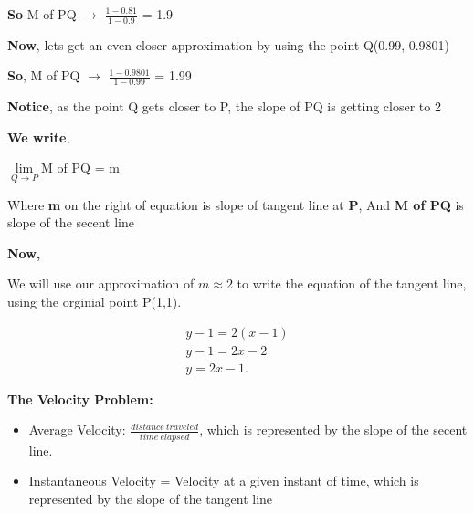 \documentclass{report}
\begin{document}
    \bigbreak \noindent 
    \begin{large}
        \textbf{So} M of PQ $\rightarrow$ $\frac{1-0.81}{1-0.9}$ = 1.9
    \end{large}

    \bigbreak \noindent 
    \textbf{Now}, lets get an even closer approximation by using the point Q(0.99, 0.9801)
    
    \bigbreak \noindent 
    \begin{large}
       \textbf{So}, M of  PQ $\rightarrow$ $ \frac{1-0.9801}{1-0.99}$ = 1.99
    \end{large}

    \pagebreak
    \noindent \textbf{Notice}, as the point Q gets closer to P, the slope of PQ is getting closer to 2
    
    \bigbreak \noindent 
    \textbf{We write}, 
    \begin{center}
        \begin{large}
            $\lim\limits_{Q \to P}${M of PQ} = m
        \end{large}
    \end{center}

    \bigbreak \noindent 
    Where \textbf{m} on the right of equation is slope of tangent line at \textbf{P}, 
    And \textbf{M of PQ} is slope of the secent line

    \bigbreak \noindent \bigbreak \noindent 
    \begin{large}
        \textbf{Now,}     
    \end{large}
    \bigbreak \noindent 
    We will use our approximation of $m \approx 2$ to write the equation of the tangent line,
    using the orginial point P(1,1).

    \begin{align*}
        y-1=2\left(x-1\right) \\
        y-1=2x-2 \\
        y=2x-1
    .\end{align*}
    
    
    \pagebreak
    \begin{large}
       \noindent \textbf{The Velocity Problem:} 
    \end{large}
    
    \bigbreak \noindent \bigbreak \noindent 
    \begin{itemize}
        \item Average Velocity: $\frac{distance\ traveled}{time\ elapsed}$, which is 
            represented by the slope of the secent line.
        \item Instantaneous Velocity = Velocity at a given instant of time, which is represented 
            by the slope of the tangent line
    \end{itemize}
\end{document}
